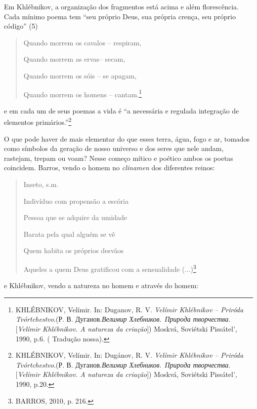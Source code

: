Em Khlébnikov, a organização dos fragmentos está acima e além
florescência. Cada mínimo poema tem ``seu próprio Deus, sua própria
crença, seu próprio código'' (5)

\begin{quote}
Quando morrem os cavalos -- respiram,

Quando morrem as ervas-- secam,

Quando morrem os sóis -- se apagam,

Quando morrem os homens -- cantam.\footnote{KHLÉBNIKOV, Velímir. In:
  Duganov, R. V. \emph{Velímir Khlébnikov -- Priróda Tvórtchestvo}.(Р.
  В. Дуганов.\emph{Велимир Хлебников}.~\emph{Природа творчества}.
  {[}\emph{Velímir Khlébnikov. A natureza da criação}{]}) Moskvá,
  Soviétski Pissátel', 1990, p.6. ( Tradução nossa).}
\end{quote}

e em cada um de seus poemas a vida é ``a necessária e regulada
integração de elementos primários.''\footnote{KHLÉBNIKOV, Velímir. In:
  Dugánov, R. V. \emph{Velímir Khlébnikov -- Priróda Tvórtchestvo}.(Р.
  В. Дуганов.\emph{Велимир Хлебников}.~\emph{Природа творчества}.
  {[}\emph{Velímir Khlébnikov. A natureza da criação}{]}) Moskvá,
  Soviétski Pissátel', 1990, p.20.}

O que pode haver de mais elementar do que esses terra, água, fogo e ar,
tomados como símbolos da geração de nosso universo e dos seres que nele
andam, rastejam, trepam ou voam? Nesse começo mítico e poético ambos os
poetas coincidem. Barros, vendo o homem no \emph{clinamen} dos
diferentes reinos:

\begin{quote}
Inseto, s.m.

Indivíduo com propensão a escória

Pessoa que se adquire da umidade

Barata pela qual alguém se vê

Quem habita os próprios desvãos

Aqueles a quem Deus gratificou com a sensualidade (...)\footnote{BARROS,
  2010, p. 216.}
\end{quote}

e Khlébnikov, vendo a natureza no homem e através do homem:

